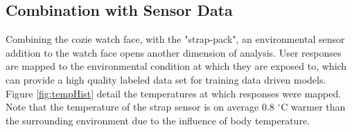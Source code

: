 \subsection{Combination with Sensor Data}

Combining the cozie watch face, with the "strap-pack", an environmental sensor addition to the watch face opens another dimension of analysis. User responses are mapped to the environmental condition at which they are exposed to, which can provide a high quality labeled data set for training data driven models. Figure \ref{fig:tempHist} detail the temperatures at which responses were mapped. Note that the temperature of the strap sensor is on average 0.8 $^\circ$C warmer than the surrounding environment due to the influence of body temperature. 


